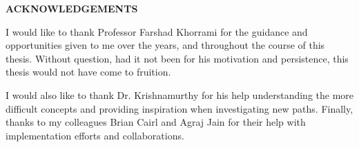 \clearpage
\vspace*{\fill}
	\begin{center}
		\begin{minipage}{\textwidth}
			{\begin{center}{\textbf{ACKNOWLEDGEMENTS}}\end{center}\vspace{10mm}}
			I would like to thank Professor Farshad Khorrami for the guidance
            and opportunities given to me over the years, and throughout the 
            course of this thesis.
            Without question, had it not been for his motivation and 
            persistence, this thesis would not have come to fruition.
			
			\vspace{5mm}
			\hspace{5mm} 
			I would also like to thank Dr. Krishnamurthy for his help
            understanding the more difficult concepts and providing inspiration
            when investigating new paths. Finally, thanks to my colleagues
            Brian Cairl and Agraj Jain for their help with implementation
            efforts and collaborations.
		\end{minipage}
	\end{center}
\vfill %
\clearpage
